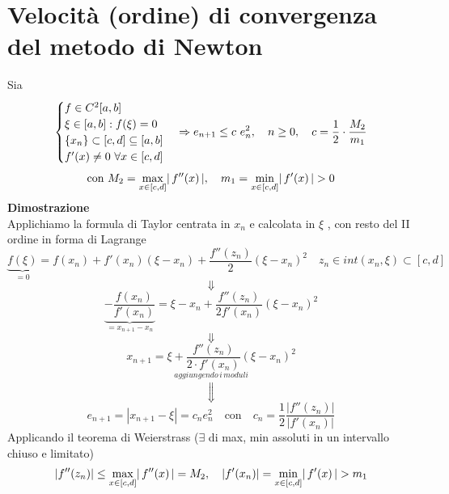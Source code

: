 \section{Velocità (ordine) di convergenza del metodo di Newton}
Sia
\[
\begin{cases}
f\in C^2[a,b]\\
\xi \in [a,b] : f(\xi) = 0\\
\{x_n\} \subset [c,d] \subseteq [a,b]\\
f'(x) \neq 0$ $\forall x\in [c,d]
\end{cases}
\Rightarrow e_{n+1} \le c\ e_n^2, \quad n\ge0, \quad c = \frac{1}{2} \cdot \frac{M_2}{m_1}
\]
\[\text{con } M_2 = \max_{x\in[c,d]}\abs{\,f''(x)\,}, \quad m_1 = \min_{x\in[c,d]}\abs{\,f'(x)\,} > 0\]
\textbf{Dimostrazione}\\
Applichiamo la formula di Taylor centrata in $x_n$ e calcolata in $\xi $ , con resto del II ordine in forma di Lagrange
\[\underbrace{f(\xi)}_{=0}=f(x_n)+f'(x_n)(\xi-x_n)+\frac{f''(z_n)}{2}(\xi-x_n)^2 \quad z_n\in int(x_n,\xi)\subset [c,d]\]
\[\Downarrow\]
\[\underbrace{-\frac{f(x_n)}{f'(x_n)}}_{= x_{n+1}-x_n}=\xi-x_n+\frac{f''(z_n)}{2f'(x_n)}(\xi-x_n)^2\]
\[\Downarrow\]
\[x_{n+1}=\xi+\frac{f''(z_n)}{2\cdot f'(x_n)}(\xi-x_n)^2\]
\[\overset{aggiungendo\,i\,moduli}{\Downarrow}\]
\[e_{n+1}=|x_{n+1}-\xi|=c_ne_n^2 \quad \text{con} \quad c_n=\frac{1}{2}\frac{|f''(z_n)|}{|f'(x_n)|}\]
Applicando il teorema di Weierstrass ($\exists$ di max, min assoluti in un intervallo chiuso e limitato)
\[\abs*{f''(z_n)}\leq \max_{x\in[c,d]}\abs{\,f''(x)\,}=M_2,\quad \abs*{f'(x_n)} = \min_{x\in[c,d]}\abs{\,f'(x)\,} > m_1\]